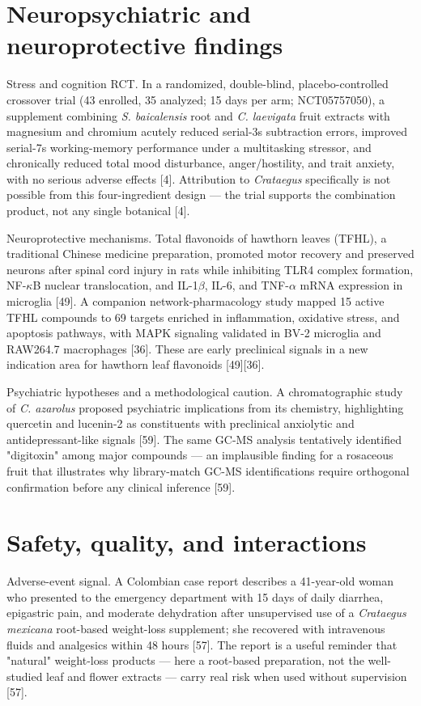 \documentclass[11pt]{article}
\begin{document}
\section*{Neuropsychiatric and neuroprotective findings}
Stress and cognition RCT. In a randomized, double-blind, placebo-controlled crossover trial (43 enrolled, 35 analyzed; 15 days per arm; NCT05757050), a supplement combining \emph{S. baicalensis} root and \emph{C. laevigata} fruit extracts with magnesium and chromium acutely reduced serial-3s subtraction errors, improved serial-7s working-memory performance under a multitasking stressor, and chronically reduced total mood disturbance, anger/hostility, and trait anxiety, with no serious adverse effects [4]. Attribution to \emph{Crataegus} specifically is not possible from this four-ingredient design --- the trial supports the combination product, not any single botanical [4].

Neuroprotective mechanisms. Total flavonoids of hawthorn leaves (TFHL), a traditional Chinese medicine preparation, promoted motor recovery and preserved neurons after spinal cord injury in rats while inhibiting TLR4 complex formation, NF-$\kappa$B nuclear translocation, and IL-1$\beta$, IL-6, and TNF-$\alpha$ mRNA expression in microglia [49]. A companion network-pharmacology study mapped 15 active TFHL compounds to 69 targets enriched in inflammation, oxidative stress, and apoptosis pathways, with MAPK signaling validated in BV-2 microglia and RAW264.7 macrophages [36]. These are early preclinical signals in a new indication area for hawthorn leaf flavonoids [49][36].

Psychiatric hypotheses and a methodological caution. A chromatographic study of \emph{C. azarolus} proposed psychiatric implications from its chemistry, highlighting quercetin and lucenin-2 as constituents with preclinical anxiolytic and antidepressant-like signals [59]. The same GC-MS analysis tentatively identified "digitoxin" among major compounds --- an implausible finding for a rosaceous fruit that illustrates why library-match GC-MS identifications require orthogonal confirmation before any clinical inference [59].

\section*{Safety, quality, and interactions}
Adverse-event signal. A Colombian case report describes a 41-year-old woman who presented to the emergency department with 15 days of daily diarrhea, epigastric pain, and moderate dehydration after unsupervised use of a \emph{Crataegus mexicana} root-based weight-loss supplement; she recovered with intravenous fluids and analgesics within 48 hours [57]. The report is a useful reminder that "natural" weight-loss products --- here a root-based preparation, not the well-studied leaf and flower extracts --- carry real risk when used without supervision [57].
\end{document}
